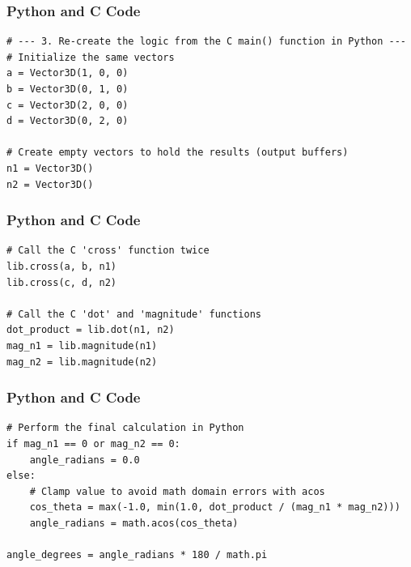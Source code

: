 \documentclass{beamer}
\begin{document}
\begin{frame}[fragile]
\frametitle{Python and C Code}

\begin{lstlisting}
# --- 3. Re-create the logic from the C main() function in Python ---
# Initialize the same vectors
a = Vector3D(1, 0, 0)
b = Vector3D(0, 1, 0)
c = Vector3D(2, 0, 0)
d = Vector3D(0, 2, 0)

# Create empty vectors to hold the results (output buffers)
n1 = Vector3D()
n2 = Vector3D()
\end{lstlisting}
\end{frame}

\begin{frame}[fragile]
\frametitle{Python and C Code}

\begin{lstlisting}
# Call the C 'cross' function twice
lib.cross(a, b, n1)
lib.cross(c, d, n2)

# Call the C 'dot' and 'magnitude' functions
dot_product = lib.dot(n1, n2)
mag_n1 = lib.magnitude(n1)
mag_n2 = lib.magnitude(n2)
\end{lstlisting}
\end{frame}

\begin{frame}[fragile]
\frametitle{Python and C Code}

\begin{lstlisting}
# Perform the final calculation in Python
if mag_n1 == 0 or mag_n2 == 0:
    angle_radians = 0.0
else:
    # Clamp value to avoid math domain errors with acos
    cos_theta = max(-1.0, min(1.0, dot_product / (mag_n1 * mag_n2)))
    angle_radians = math.acos(cos_theta)

angle_degrees = angle_radians * 180 / math.pi
\end{lstlisting}
\end{frame}
\end{document}
